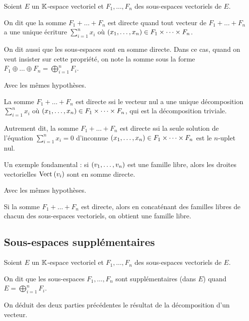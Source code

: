 \begin{defi}
Soient \(E\) un \(\mathbb{K}\)-espace vectoriel et \(F_1,\dots,F_n\) des sous-espaces vectoriels de \(E\).

On dit que la somme \(F_1+\dots+F_n\) est directe quand tout vecteur de \(F_1+\dots+F_n\) a une unique écriture \(\sum_{i=1}^nx_i\) où \(\left(x_1,\dots,x_n\right)\in F_1\times\dots\times F_n\).
\end{defi}

On dit aussi que les sous-espaces sont en somme directe. Dans ce cas, quand on veut insister sur cette propriété, on note la somme sous la forme \(F_1\oplus\dots\oplus F_n=\bigoplus_{i=1}^nF_i\).

\begin{prop}
Avec les mêmes hypothèses.

La somme \(F_1+\dots+F_n\) est directe ssi le vecteur nul a une unique décomposition \(\sum_{i=1}^nx_i\) où \(\left(x_1,\dots,x_n\right)\in F_1\times\dots\times F_n\), qui est la décomposition triviale.

Autrement dit, la somme \(F_1+\dots+F_n\) est directe ssi la seule solution de l'équation \(\sum_{i=1}^nx_i=0\) d'inconnue \(\left(x_1,\dots,x_n\right)\in F_1\times\dots\times F_n\) est le \(n\)-uplet nul.
\end{prop}

Un exemple fondamental : si \(\left(v_1,\dots,v_n\right)\) est une famille libre, alors les droites vectorielles \(\Vect{v_i}\) sont en somme directe.

\begin{prop}
Avec les mêmes hypothèses.

Si la somme \(F_1+\dots+F_n\) est directe, alors en concaténant des familles libres de chacun des sous-espaces vectoriels, on obtient une famille libre.
\end{prop}

\subsection{Sous-espaces supplémentaires}

\begin{defi}
Soient \(E\) un \(\mathbb{K}\)-espace vectoriel et \(F_1,\dots,F_n\) des sous-espaces vectoriels de \(E\).

On dit que les sous-espaces \(F_1,\dots,F_n\) sont supplémentaires (dans \(E\)) quand \(E=\bigoplus_{i=1}^nF_i\).
\end{defi}

On déduit des deux parties précédentes le résultat de la décomposition d'un vecteur.

